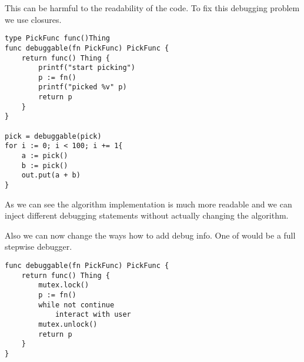 This can be harmful to the readability of the code. To fix this debugging problem we use closures.

\begin{verbatim}
type PickFunc func()Thing
func debuggable(fn PickFunc) PickFunc {
    return func() Thing {
        printf("start picking")
        p := fn()
        printf("picked %v" p)
        return p
    }
}

pick = debuggable(pick)
for i := 0; i < 100; i += 1{
    a := pick()
    b := pick()
    out.put(a + b)
}
\end{verbatim}

As we can see the algorithm implementation is much more readable and 
we can inject different debugging statements without actually changing the algorithm.

Also we can now change the ways how to add debug info. One of would 
be a full stepwise debugger.

\begin{verbatim}
func debuggable(fn PickFunc) PickFunc {
    return func() Thing {
        mutex.lock()
        p := fn()
        while not continue
            interact with user
        mutex.unlock()
        return p
    }
}
\end{verbatim}